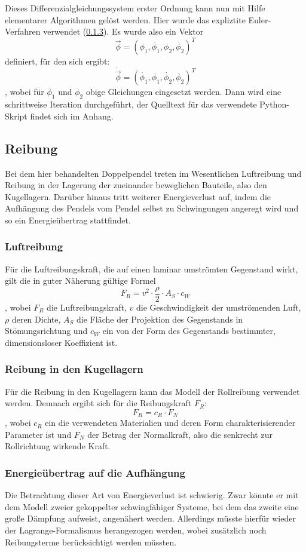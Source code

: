 Dieses Differenzialgleichungssystem erster Ordnung kann nun mit Hilfe elementarer Algorithmen gelöst werden. Hier wurde das expliztite Euler-Verfahren verwendet (\ref{}). Es wurde also ein Vektor $$ \vec{\phi} = (
\phi_1, \dot{\phi_1}, \phi_2 , \dot{\phi_2})^{T} $$ 
 definiert, für den sich ergibt: 
\begin{equation}
\dot{\vec{\phi}} = (\dot{\phi_1}, \ddot{\phi_1}, \dot{\phi_2}, \ddot{\phi_2})^{T}
\end{equation}
, wobei für $ \ddot{\phi_1} $ und $ \ddot{\phi_2} $ obige Gleichungen eingesetzt werden. 
Dann wird eine schrittweise Iteration durchgeführt, der Quelltext für das verwendete Python-Skript findet sich im Anhang. 

\subsection{Reibung}
Bei dem hier behandelten Doppelpendel treten im Wesentlichen Luftreibung und Reibung in der Lagerung der zueinander beweglichen Bauteile, also den Kugellagern. Darüber hinaus tritt weiterer Energieverlust auf, indem die Aufhängung des Pendels vom Pendel selbst zu Schwingungen angeregt wird und so ein Energieübertrag stattfindet. 

\subsubsection{Luftreibung}
Für die Luftreibungskraft, die auf einen laminar umströmten Gegenstand wirkt, gilt die in guter Näherung gültige Formel
\begin{equation}
F_R = v^2 \cdot \frac{\rho}{2} \cdot A_S \cdot c_W
\end{equation}, 
wobei $ F_R $ die Luftreibungskraft, $ v $ die Geschwindigkeit der umströmenden Luft, $ \rho $ deren Dichte, $ A_S $ die Fläche der Projektion des Gegenstands in Stömungsrichtung und $ c_W $ ein von der Form des Gegenstands bestimmter, dimensionsloser Koeffizient ist. 


\subsubsection{Reibung in den Kugellagern}
Für die Reibung in den Kugellagern kann das Modell der Rollreibung verwendet werden. Demnach ergibt sich für die Reibungskraft $ F_R $:
\begin{equation}
F_R = c_R \cdot F_N
\end{equation}, 
wobei $ c_R $ ein die verwendeten Materialien und deren Form charakterisierender Parameter ist und $ F_N $ der Betrag der Normalkraft, also die senkrecht zur Rollrichtung wirkende Kraft. 

\subsubsection{Energieübertrag auf die Aufhängung}

Die Betrachtung dieser Art von Energieverlust ist schwierig. Zwar könnte er mit dem Modell zweier gekoppelter schwingfähiger Systeme, bei dem das zweite eine große Dämpfung aufweist, angenähert werden. Allerdings müsste hierfür wieder der Lagrange-Formalismus herangezogen werden, wobei zusätzlich noch Reibungsterme berücksichtigt werden müssten. 
